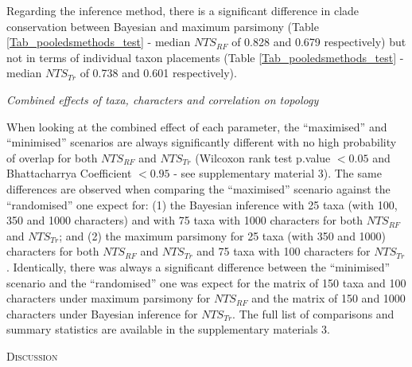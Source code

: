 \documentclass[12pt,letterpaper]{article}
\renewcommand{\section}[1]{%
\bigskip
\begin{center}
\begin{Large}
\normalfont\scshape #1
\medskip
\end{Large}
\end{center}}
\renewcommand{\subsection}[1]{%
\bigskip
\begin{center}
\begin{large}
\normalfont\itshape #1
\end{large}
\end{center}}
\begin{document}
Regarding the inference method, there is a significant difference in clade conservation between Bayesian and maximum parsimony (Table \ref{Tab_pooledsmethods_test} - median $NTS_{RF}$ of 0.828 and 0.679 respectively) but not in terms of individual taxon placements (Table \ref{Tab_pooledsmethods_test} - median $NTS_{Tr}$ of 0.738 and 0.601 respectively).



\subsection{Combined effects of taxa, characters and correlation on topology}

When looking at the combined effect of each parameter, the ``maximised'' and ``minimised'' scenarios are always significantly different with no high probability of overlap for both $NTS_{RF}$ and $NTS_{Tr}$ (Wilcoxon rank test p.value $<0.05$ and Bhattacharrya Coefficient $<0.95$ - see supplementary material 3).
The same differences are observed when comparing the ``maximised'' scenario against the ``randomised'' one expect for: (1) the Bayesian inference with 25 taxa (with 100, 350 and 1000 characters) and with 75 taxa with 1000 characters for both $NTS_{RF}$ and $NTS_{Tr}$; and (2) the maximum parsimony for 25 taxa (with 350 and 1000) characters for both $NTS_{RF}$ and $NTS_{Tr}$ and 75 taxa with 100 characters for $NTS_{Tr}$.
Identically, there was always a significant difference between the ``minimised'' scenario and the ``randomised'' one was expect for the matrix of 150 taxa and 100 characters under maximum parsimony for $NTS_{RF}$ and the matrix of 150 and 1000 characters under Bayesian inference for $NTS_{Tr}$.
The full list of comparisons and summary statistics are available in the supplementary materials 3.

\section{Discussion}
\end{document}
